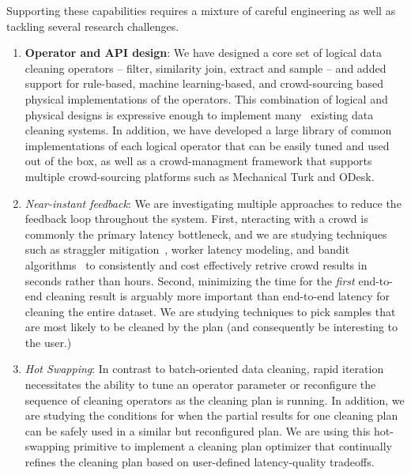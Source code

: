 Supporting these capabilities requires a mixture of careful engineering as well as tackling several research challenges.

\begin{enumerate}
\item {\bf Operator and API design}: We have designed a core set of logical data cleaning operators --
filter, similarity join, extract and sample -- and added support for rule-based, machine learning-based, and 
crowd-sourcing based physical implementations of the operators.  
This combination of logical and physical designs is expressive enough to implement many~\cite{} existing
data cleaning systems.  In addition, we have developed a large library of common implementations of 
each logical operator that can be easily tuned and used out of the box, as well as a crowd-managment 
framework that supports multiple crowd-sourcing platforms such as Mechanical Turk and ODesk.

\item {\it Near-instant feedback}: We are investigating multiple approaches to reduce the 
feedback loop throughout the system.  First, nteracting with a crowd is commonly the primary latency bottleneck,
and we are studying techniques such as straggler mitigation~\cite{poweroftwo}, worker latency modeling, and
bandit algorithms~\cite{} to consistently and cost effectively retrive crowd results in seconds rather than hours. 
Second, minimizing the time for the {\it first} end-to-end cleaning result is arguably more important than 
end-to-end latency for cleaning the entire dataset.    We are studying techniques to pick samples that are
most likely to be cleaned by the plan (and consequently be interesting to the user.)

\item {\it Hot Swapping}: In contrast to batch-oriented data cleaning, rapid iteration necessitates the
ability to tune an operator parameter or reconfigure the sequence of cleaning operators as the cleaning
plan is running.   In addition, we are studying the conditions for when the partial results for one
cleaning plan can be safely used in a similar but reconfigured plan.  We are using this hot-swapping primitive
to implement a cleaning plan optimizer that continually refines the cleaning plan based on user-defined latency-quality
tradeoffs.

\end{enumerate}


